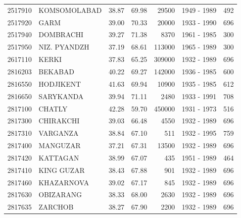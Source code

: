 \begin{longtable}{lp{4.3cm}llrlr}
2517910 & KOMSOMOLABAD & 38.87 & 69.98 & 29500 & 1949 - 1989 & 492 \\
2517920 & GARM & 39.00 & 70.33 & 20000 & 1933 - 1990 & 696 \\
2517940 & DOMBRACHI & 39.27 & 71.38 & 8370 & 1961 - 1985 & 300 \\
2517950 & NIZ. PYANDZH & 37.19 & 68.61 & 113000 & 1965 - 1989 & 300 \\
2617110 & KERKI & 37.83 & 65.25 & 309000 & 1932 - 1989 & 696 \\
2816203 & BEKABAD & 40.22 & 69.27 & 142000 & 1936 - 1985 & 600 \\
2816550 & HODJIKENT & 41.63 & 69.94 & 10900 & 1935 - 1985 & 612 \\
2816650 & SARYKANDA & 39.94 & 71.11 & 2480 & 1933 - 1991 & 708 \\
2817100 & CHATLY & 42.28 & 59.70 & 450000 & 1931 - 1973 & 516 \\
2817300 & CHIRAKCHI & 39.03 & 66.48 & 4550 & 1932 - 1989 & 696 \\
2817310 & VARGANZA & 38.84 & 67.10 & 511 & 1932 - 1995 & 759 \\
2817400 & MANGUZAR & 37.21 & 67.31 & 13500 & 1932 - 1989 & 696 \\
2817420 & KATTAGAN & 38.99 & 67.07 & 435 & 1951 - 1989 & 464 \\
2817410 & KING GUZAR & 38.43 & 67.88 & 901 & 1932 - 1989 & 696 \\
2817460 & KHAZARNOVA & 39.02 & 67.17 & 845 & 1932 - 1989 & 696 \\
2817630 & OBIZARANG & 38.33 & 68.00 & 2630 & 1932 - 1989 & 696 \\
2817635 & ZARCHOB & 38.27 & 67.90 & 2200 & 1932 - 1989 & 696 \\
\end{longtable}
